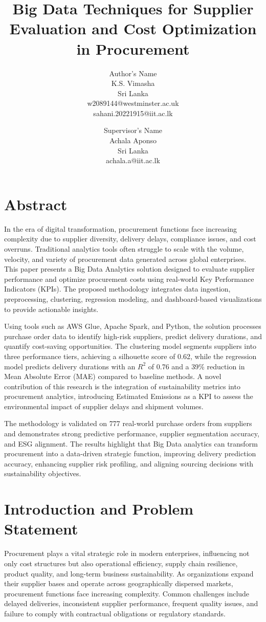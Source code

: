 \documentclass[10pt, twocolumn]{article}
\title{\textbf{Big Data Techniques for Supplier Evaluation and Cost Optimization in Procurement}}
\author{
    \fontsize{11}{13}\selectfont 
    1\ts{st} Author's Name \\
    \fontsize{10}{11}\selectfont 
    K.S. Vimasha\\
    \fontsize{10}{11}\selectfont 
    Sri Lanka\\
    \fontsize{10}{11}\selectfont
    w2089144@westminster.ac.uk\\
    \fontsize{10}{11}\selectfont
    sahani.20221915@iit.ac.lk\\
    \and
    \fontsize{11}{13}\selectfont 
    Supervisor's Name\\
    \fontsize{10}{11}
    \selectfont Achala Aponso\\
    \fontsize{10}{11}\selectfont 
    Sri Lanka\\
    \fontsize{10}{11}\selectfont
    achala.a@iit.ac.lk \\
}
\date{}
\begin{document}
\maketitle

\section*{Abstract}

In the era of digital transformation, procurement functions face increasing complexity due to supplier diversity, delivery delays, compliance issues, and cost overruns. Traditional analytics tools often struggle to scale with the volume, velocity, and variety of procurement data generated across global enterprises. This paper presents a Big Data Analytics solution designed to evaluate supplier performance and optimize procurement costs using real-world Key Performance Indicators (KPIs). The proposed methodology integrates data ingestion, preprocessing, clustering, regression modeling, and dashboard-based visualizations to provide actionable insights.

Using tools such as AWS Glue, Apache Spark, and Python, the solution processes purchase order data to identify high-risk suppliers, predict delivery durations, and quantify cost-saving opportunities. The clustering model segments suppliers into three performance tiers, achieving a silhouette score of 0.62, while the regression model predicts delivery durations with an $R^2$ of 0.76 and a 39\% reduction in Mean Absolute Error (MAE) compared to baseline methods. A novel contribution of this research is the integration of sustainability metrics into procurement analytics, introducing Estimated Emissions as a KPI to assess the environmental impact of supplier delays and shipment volumes.

The methodology is validated on 777 real-world purchase orders from suppliers and demonstrates strong predictive performance, supplier segmentation accuracy, and ESG alignment. The results highlight that Big Data analytics can transform procurement into a data-driven strategic function, improving delivery prediction accuracy, enhancing supplier risk profiling, and aligning sourcing decisions with sustainability objectives.


\section{Introduction and Problem Statement}

Procurement plays a vital strategic role in modern enterprises, influencing not only cost structures but also operational efficiency, supply chain resilience, product quality, and long-term business sustainability. As organizations expand their supplier bases and operate across geographically dispersed markets, procurement functions face increasing complexity. Common challenges include delayed deliveries, inconsistent supplier performance, frequent quality issues, and failure to comply with contractual obligations or regulatory standards.
\end{document}
